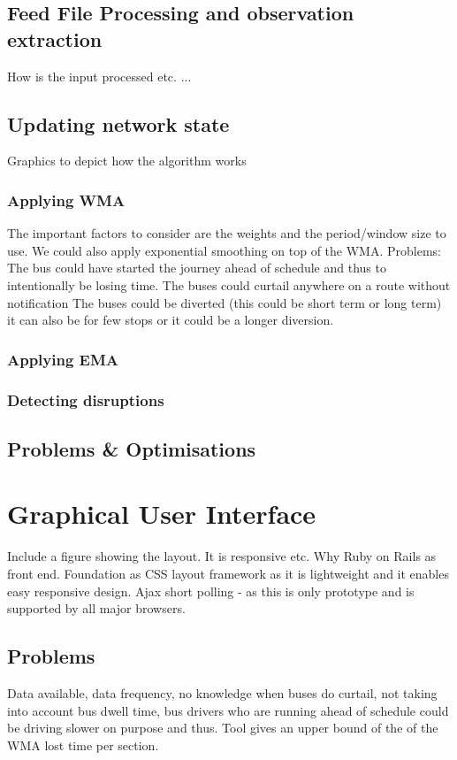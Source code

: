 	\subsection{Feed File Processing and observation extraction}
	How is the input processed etc. ...
	
	\subsection{Updating network state}
	Graphics to depict how the algorithm works
		\subsubsection{Applying WMA}
	The important factors to consider are the weights and the period/window size to use. We could also apply exponential smoothing on top of the WMA.
	Problems:
The bus could have started the journey ahead of schedule and thus to intentionally be losing time.
The buses could curtail anywhere on a route without notification
The buses could be diverted (this could be short term or long term) it can also be for few stops or it could be a longer diversion.

		\subsubsection{Applying EMA}
		
		\subsubsection{Detecting disruptions}
	
	\subsection{Problems \& Optimisations}
	
\section{Graphical User Interface}
Include a figure showing the layout. It is responsive etc.
Why Ruby on Rails as front end. Foundation as CSS layout framework as it is lightweight and it enables easy responsive design.
Ajax short polling - as this is only prototype and is supported by all major browsers.


\subsection{Problems}
Data available, data frequency, no knowledge when buses do curtail, not taking into account bus dwell time, bus drivers who are running ahead of schedule could be driving slower on purpose and thus. Tool gives an upper bound of the of the WMA lost time per section. 
